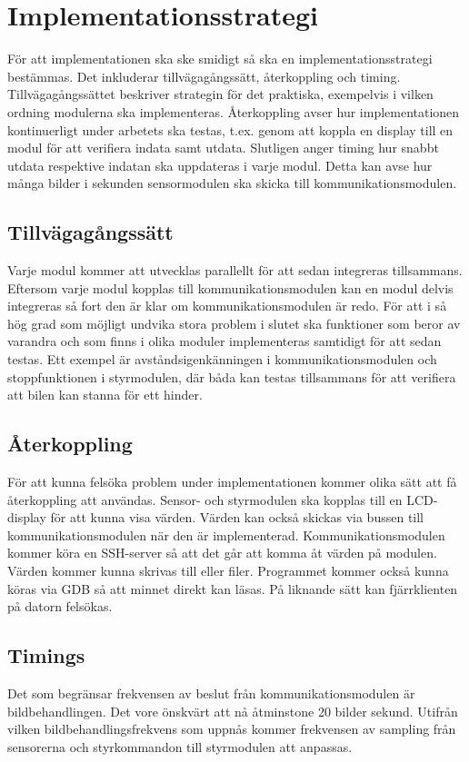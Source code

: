 \documentclass[designspec/spec.tex]{subfiles}
\begin{document}
\section{Implementationsstrategi}

För att implementationen ska ske smidigt så ska en implementationsstrategi
bestämmas. Det inkluderar tillvägagångssätt, återkoppling och timing.
Tillvägagångssättet beskriver strategin för det praktiska, exempelvis i vilken
ordning modulerna ska implementeras. Återkoppling avser hur implementationen
kontinuerligt under arbetets ska testas, t.ex. genom att koppla en display till
en modul för att verifiera indata samt utdata.
Slutligen anger timing hur snabbt utdata respektive indatan ska
uppdateras i varje modul. Detta kan avse hur många bilder i sekunden
sensormodulen ska skicka till kommunikationsmodulen. 

\subsection{Tillvägagångssätt}
Varje modul kommer att utvecklas parallellt för att sedan integreras
tillsammans. Eftersom varje modul kopplas till kommunikationsmodulen kan en
modul delvis integreras så fort den är klar om kommunikationsmodulen är
redo. För att i så hög grad som möjligt undvika stora problem i slutet ska
funktioner som beror av varandra och som finns i olika moduler implementeras
samtidigt för att sedan testas. Ett exempel är avståndsigenkänningen i
kommunikationsmodulen och stoppfunktionen i styrmodulen, där båda kan testas
tillsammans för att verifiera att bilen kan stanna för ett hinder.

\subsection{Återkoppling}
För att kunna felsöka problem under implementationen kommer olika sätt att få
återkoppling att användas. Sensor- och styrmodulen ska kopplas till en
LCD-display för att kunna visa värden. Värden kan också skickas via bussen till
kommunikationsmodulen när den är implementerad. Kommunikationsmodulen kommer
köra en SSH-server så att det går att komma åt värden på modulen. Värden kommer
kunna skrivas till  eller filer. Programmet kommer också kunna
köras via GDB så att minnet direkt kan läsas. På liknande sätt kan
fjärrklienten på datorn felsökas.

\subsection{Timings}
Det som begränsar frekvensen av beslut från kommunikationsmodulen är
bildbehandlingen. Det vore önskvärt att nå åtminstone 20 bilder sekund. Utifrån
vilken bildbehandlingsfrekvens som uppnås kommer frekvensen av sampling från
sensorerna och styrkommandon till styrmodulen att anpassas. 
\end{document}
